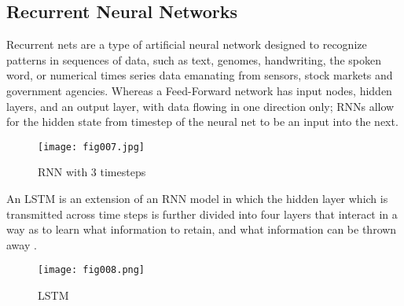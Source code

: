 \hfill \break
\hfill \break
\hfill \break
\hfill \break





\subsection{Recurrent Neural Networks}

Recurrent nets are a type of artificial neural network designed to recognize patterns in sequences of data, such as text, genomes, handwriting, the spoken word, or numerical times series data emanating from sensors, stock markets and government agencies. Whereas a Feed-Forward network has input nodes, hidden layers, and an output layer, with data flowing in one direction only; RNNs allow for the hidden state from timestep of the neural net to be an input into the next.

\begin{figure}[h!]
	\centering
	\texttt{[image: fig007.jpg]}
	\caption{RNN with 3 timesteps}
	\label{fig:fig7}
\end{figure} 

An LSTM is an extension of an RNN model in which the hidden layer which is transmitted across time steps is further divided into four layers that interact in a way as to learn what information to retain, and what information can be thrown away \parencite{Olah}. 

\begin{figure}[h!]
	\centering
	\texttt{[image: fig008.png]}
	\caption{LSTM}
	\label{fig:fig8}
\end{figure} 
